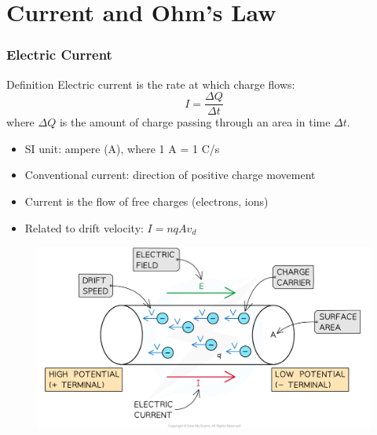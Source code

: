 \documentclass{beamer}
\begin{document}
\section{Current and Ohm's Law}
\begin{frame}
    \frametitle{Electric Current}
    \begin{block}{Definition}
        Electric current is the rate at which charge flows:
        \[ I = \frac{\Delta Q}{\Delta t} \]
        where $\Delta Q$ is the amount of charge passing through an area in time $\Delta t$.
    \end{block}
    \begin{itemize}
        \item SI unit: ampere (A), where 1 A = 1 C/s
        \item Conventional current: direction of positive charge movement
        \item Current is the flow of free charges (electrons, ions)
        \item Related to drift velocity: $I = nqAv_d$
    \end{itemize}
    \end{frame}
    \begin{frame}{}
    \begin{figure}
        \centering
        \includegraphics[width=1\linewidth]{phys12-circuits-charge-carrier-drift.png}
    \end{figure}
\end{frame}
\end{document}
